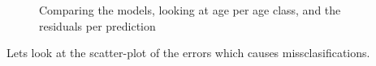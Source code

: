 \documentclass[10pt,letterpaper]{article}
\begin{document}
\begin{figure}
  \caption{\label{ref_label_overall}Comparing the models, looking at age per age class, and the residuals per prediction}
\end{figure}

Lets look at the scatter-plot of the errors which causes missclasifications.
\end{document}
